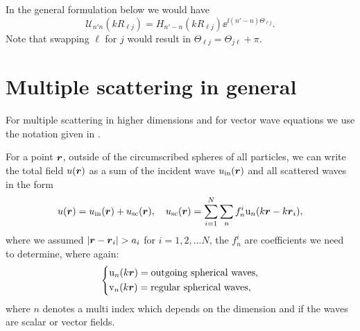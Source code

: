 \documentclass[ 12pt, a4paper]{article}
\begin{document}
In the general formulation below we would have
\[
\mathcal U_{n'n}(k R_{\ell j}) = H_{n'-n}(k R_{\ell j})\ee^{\ii(n'-n)\Theta_{\ell j}}.
\]
Note that swapping $\ell$ for $j$ would result in $\Theta_{\ell j} = \Theta_{j \ell } + \pi$.

\section{Multiple scattering in general}

For multiple scattering in higher dimensions and for vector wave equations we use the notation given in \cite{gower2020effective}.

For a point $\boldsymbol{r}$, outside of the circumscribed spheres of all particles, we can write the total field $u(\boldsymbol{r})$ as a sum of the incident wave $u_{\mathrm{in}}(\boldsymbol{r})$ and all scattered waves in the form~\cite{Kristensson2015a,Kristensson2016,Linton+Martin2006}
\begin{equation}
    u(\boldsymbol{r}) = u_{\mathrm{in}}(\boldsymbol{r}) + u_{\mathrm{sc}}(\boldsymbol{r}), \quad u_{\mathrm{sc}}(\boldsymbol{r}) =  \sum_{i=1}^N \sum_n f_n^i \mathrm u_n (k \boldsymbol{r} - k \boldsymbol{r}_i),
    \label{eqn:total_discrete_wave}
\end{equation}
where we assumed $ |\boldsymbol{r} - \boldsymbol{r}_i| > a_i $ for $i=1,2,\ldots N$, the $f_n^i$ are coefficients we need to determine, where again:
\begin{equation}
\left\{\begin{aligned}
    & \mathrm u_{n}(k\boldsymbol{r}) = \text{outgoing spherical waves},
    \label{eqn:outgoing_waves_and_regular_waves}
    \\
    & \mathrm v_{n}(k\boldsymbol{r})= \text{regular spherical waves},
 \end{aligned}\right.
\end{equation}
where $n$ denotes a multi index which depends on the dimension and if the waves are scalar or vector fields.
\end{document}
